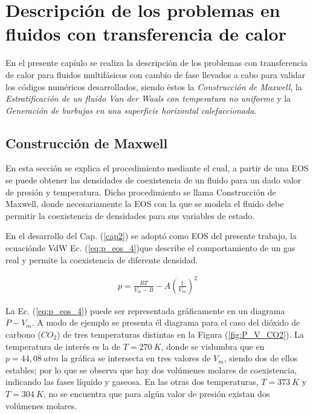 \chapter{Descripción de los problemas en fluidos con transferencia de calor }
\graphicspath{{figs/cap4/}}
\label{cap4}

En el presente capíulo se realiza la descripción de los problemas con transferencia de calor para fluidos multifásicos con cambio de fase llevados a cabo para validar los códigos numéricos desarrollados, siendo éstos la \textit{Construcción de Maxwell}, la \textit{Estratificación de un fluido Van der Waals con temperatura no uniforme} y la \textit{Generación de burbujas en una superficie horizontal calefaccionada}.

\section{Construcción de Maxwell}

En esta sección se explica el procedimiento mediante el cual, a partir de una EOS se puede obtener las densidades de coexistencia de un fluido para un dado valor de presión y temperatura. Dicho procedimiento se llama Construcción de Maxwell, donde necesariamente la EOS con la que se modela el fluido debe permitir la coexistencia de densidades para sus variables de estado.

En el desarrollo del Cap. (\ref{cap2}) se adoptó como EOS del presente trabajo, la ecuaciónde VdW Ec. (\ref{eq:p_eos_4})que describe el comportamiento de un gas real y permite la coexistencia de diferente densidad.

\begin{align}
	p = \frac{R T}{V_m - B} - A {\left(\frac{1}{V_m}\right)}^2
	\label{eq:p_eos_4}
\end{align}

La Ec. (\ref{eq:p_eos_4}) puede ser representada gráficamente en un diagrama $P - V_m$. A modo de ejemplo se presenta él diagrama para el caso del dióxido de carbono ($CO_2$) de tres temperaturas distintas en la Figura (\ref{fig:P_V_CO2}).  La temperatura de interés es la de $T = 270 \> K$, donde se vislumbra que en $p = 44,08 \> atm$ la gráfica se intersecta en tres valores de $V_m$, siendo dos de ellos estables; por lo que se observa que hay dos volúmenes molares de coexistencia, indicando las fases líquido y gaseosa. En las otras dos temperaturas, $T = 373 \> K$ y $T = 304 \> K$, no se encuentra que para algún valor de presión existan dos volúmenes molares.


